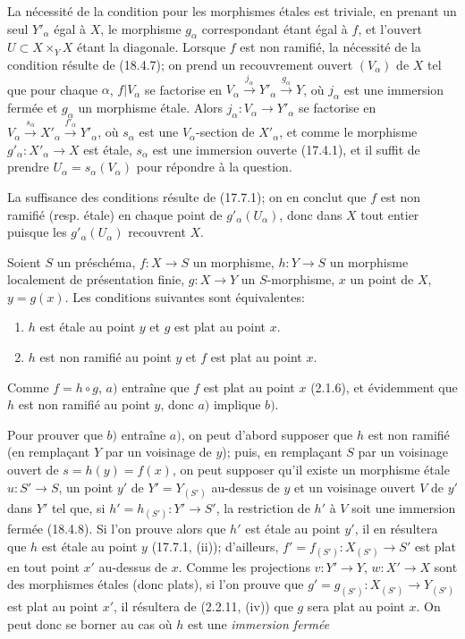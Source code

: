 La nécessité de la condition pour les morphismes étales est triviale, en prenant un seul $Y'_\alpha$ égal à $X$, le morphisme $g_\alpha$ correspondant étant égal à $f$, et l'ouvert $U\subset X\times_Y X$ étant la diagonale. Lorsque $f$ est non ramifié, la nécessité de la condition résulte de (18.4.7); on prend un recouvrement ouvert $(V_\alpha)$ de $X$ tel que pour chaque $\alpha$, $f|V_\alpha$ se factorise en $V_\alpha\xrightarrow{j_\alpha}Y'_\alpha\xrightarrow{g_\alpha}Y$, où $j_\alpha$ est une immersion fermée et $g_\alpha$ un morphisme étale. Alors $j_\alpha:V_\alpha\to Y'_\alpha$ se factorise en $V_\alpha\xrightarrow{s_\alpha}X'_\alpha\xrightarrow{f'_\alpha}Y'_\alpha$, où $s_\alpha$ est une $V_\alpha$-section de $X'_\alpha$, et comme le morphisme $g'_\alpha:X'_\alpha\to X$ est étale, $s_\alpha$ est une immersion ouverte (17.4.1), et il suffit de prendre $U_\alpha=s_\alpha(V_\alpha)$ pour répondre à la question.

La suffisance des conditions résulte de (17.7.1); on en conclut que $f$ est non ramifié (resp. étale) en chaque point de $g'_\alpha(U_\alpha)$, donc dans $X$ tout entier puisque les $g'_\alpha(U_\alpha)$ recouvrent $X$.

\begin{proposition}[18.4.9]
\label{IV.18.4.9}
Soient $S$ un préschéma, $f:X\to S$ un morphisme, $h:Y\to S$ un morphisme localement de présentation finie, $g:X\to Y$ un $S$-morphisme, $x$ un point de $X$, $y=g(x)$. Les conditions suivantes sont équivalentes:
\begin{enumerate}
  \item[a)] $h$ est étale au point $y$ et $g$ est plat au point $x$.
  \item[b)] $h$ est non ramifié au point $y$ et $f$ est plat au point $x$.
\end{enumerate}
\end{proposition}

Comme $f=h\circ g$, $a)$ entraîne que $f$ est plat au point $x$ (2.1.6), et évidemment que $h$ est non ramifié au point $y$, donc $a)$ implique $b)$.

Pour prouver que $b)$ entraîne $a)$, on peut d'abord supposer que $h$ est non ramifié (en remplaçant $Y$ par un voisinage de $y$); puis, en remplaçant $S$ par un voisinage ouvert de $s=h(y)=f(x)$, on peut supposer qu'il existe un morphisme étale $u:S'\to S$, un point $y'$ de $Y'=Y_{(S')}$ au-dessus de $y$ et un voisinage ouvert $V$ de $y'$ dans $Y'$ tel que, si $h'=h_{(S')}:Y'\to S'$, la restriction de $h'$ à $V$ soit une immersion fermée (18.4.8). Si l'on prouve alors que $h'$ est étale au point $y'$, il en résultera que $h$ est étale au point $y$ (17.7.1, (ii)); d'ailleurs, $f'=f_{(S')}:X_{(S')}\to S'$ est plat en tout point $x'$ au-dessus de $x$. Comme les projections $v:Y'\to Y$, $w:X'\to X$ sont des morphismes étales (donc plats), si l'on prouve que $g'=g_{(S')}:X_{(S')}\to Y_{(S')}$ est plat au point $x'$, il résultera de (2.2.11, (iv)) que $g$ sera plat au point $x$. On peut donc se borner au cas où $h$ est une \emph{immersion fermée}

